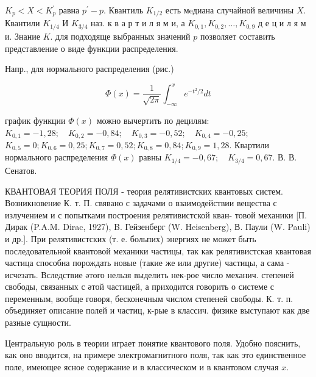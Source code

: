 \documentclass[10pt]{article}
\begin{document}
$K_{p}<X<K_{p}^{\prime}$ равна $p^{\prime}-p$. Квантиль $K_{1 / 2}$ есть мeдиана случайной величины $X$. Квантили $K_{1 / 4}$ И $K_{3 / 4}$ наз. к в а р т и л я м и, а $K_{0,1}, K_{0,2}, \ldots, K_{0,9}$ д е ц и л я м и. Знание $K$. для подходяще выбранных значений $p$ позволяет составить представление о виде функции распределения.



Напр., для нормального распределения (рис.)



\[

\Phi(x)=\frac{1}{\sqrt{2 \pi}} \int_{-\infty}^{x} e^{-t^{2} / 2} d t

\]



график функции $\Phi(x)$ можно вычертить по децилям: $K_{0,1}=-1,28 ; \quad K_{0,2}=-0,84 ; \quad K_{0,3}=-0,52 ; \quad K_{0,4}=-0,25 ;$ $K_{0,5}=0 ; K_{0,6}=0,25 ; K_{0,7}=0,52 ; K_{0,8}=0,84 ; K_{0,9}=1,28$. Квартили нормального распределения $\Phi(x)$ равны $K_{1 / 4}=-0,67 ; \quad K_{3 / 4}=0,67$. В. В. Сенатов.



КВАНТОВАЯ ТЕОРИЯ ПОЛЯ - теория релятивистских квантовых систем. Возникновение К. т. П. свявано с задачами о взаимодействии вещества с излучением и с попытками построения релятивистской кван- товой механики [П. Дирак (P.A.M. Dirac, 1927), B. Гейзенберг (W. Heisenberg), В. Паули (W. Pauli) и др.]. При релятивистских (т. е. больпих) энергиях не может быть последовательной квантовой механики частицы, так как релятивистская квантовая частица способна порождать новые (такие же или другие) частицы, а сама - исчезать. Вследствие әтого нельзя выделить нек-рое число механич. степеней свободы, связанных с әтой частицей, а приходится говорить о системе с переменным, вообще говоря, бесконечным числом степеней свободы. К. т. п. объединяет описание полей и частиц, к-рые в классич. физике выступают как две разные сущности.



Центральную роль в теории играет понятие квантового поля. Удобно пояснить, как оно вводится, на примере электромагнитного поля, так как это единственное поле, имеющее ясное содержание и в классическом и в квантовом случая $x$.
\end{document}
